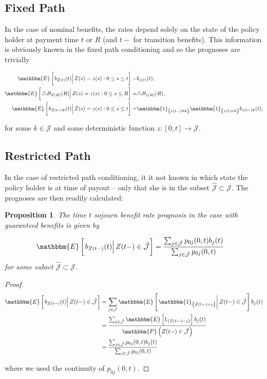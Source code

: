 \documentclass{article}
\newcommand{\1}[1]{\mathbbm{1}_{\left\lbrace #1 \right\rbrace}}
\newcommand{\expec}[1][def]{\mathbbm{E} \left[ #1 \right]}
\newcommand{\econd}[2][def]{\mathbbm{E} \left[ \left. #1 \right| #2 \right]}
\newcommand{\probability}[1][def]{\mathbbm{P} \left( #1 \right)}
\theoremstyle{break}
\newtheorem{proposition}[definition]{Proposition}%
\theoremstyle{remark}
\numberwithin{equation}{section}
\begin{document}
\subsection{Fixed Path}

In the case of nominal benefits, the rates depend solely on the state of the policy holder at payment time $t$ or $R$ (and $t-$ for transition benefits). This information is obviously known in the fixed path conditioning and so the prognoses are trivially

\begin{align*}
	\econd[b_{Z(t)}(t)]{Z(s) = z(s) : 0 \leq s \leq t} =& b_{z(t)}(t), \\
	\econd[\triangle B_{Z(R)}(R)]{Z(s) = z(s) : 0 \leq s \leq R} =& \triangle B_{z(R)}(R), \\
	\econd[b_{Z(t-)k}(t)]{ Z(s) = z(s) : 0 \leq s \leq t} =& \1{z(t-) \neq k} \1{z(t) = k} b_{z(t-) k}(t),
\end{align*}

for some $k \in \mathcal{J}$ and some deterministic function $z: [0,t] \to \mathcal{J}$.

\subsection{Restricted Path}

In the case of restricted path conditioning, it it not known in which state the policy holder is at time of payout -- only that she is in the subset $\hat{\mathcal{J}} \subset \mathcal{J}$. The prognoses are then readily calculated:

\begin{proposition} \label{SojournWithoutBonus}
The time $t$ sojourn benefit rate prognosis in the case with guaranteed benefits is given by

\begin{align*}
    \econd[b_{Z(t-)}(t)]{Z(t-) \in \hat{\mathcal{J}}}
    &= \frac{\sum_{j \in \hat{\mathcal{J}}} p_{0j}(0,t) b_j(t)}{\sum_{j \in \hat{\mathcal{J}}} p_{0j}(0,t)}
\end{align*}
for some subset $\hat{\mathcal{J}} \subset \mathcal{J}$.
\end{proposition}

\begin{proof}
\begin{align*}
   	\econd[b_{Z(t-)}(t)]{Z(t-) \in \hat{\mathcal{J}}} &= \sum_{j \in \mathcal{J}} \econd[\1{Z(t-)=j}]{Z(t-) \in \hat{\mathcal{J}}} b_j(t) \\
    &= \frac{\sum_{j \in \hat{\mathcal{J}}} \expec[ 1_{\{Z(t-)=j\}} ] b_j(t)}{\probability[Z(t-) \in \hat{\mathcal{J}}]} \\
    &= \frac{\sum_{j \in \hat{\mathcal{J}}} p_{0j}(0,t) b_j(t)}{\sum_{j \in \hat{\mathcal{J}}} p_{0j}(0,t)}
\end{align*}

where we used the continuity of $p_{0j}(0,t)$.
\end{proof}
\end{document}
